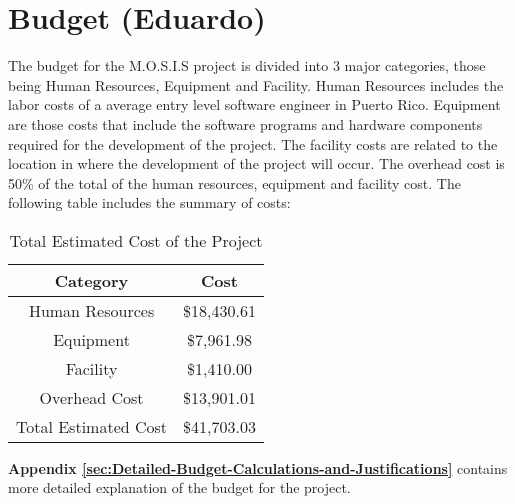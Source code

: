 
 \section{Budget (Eduardo)}
 The budget for the M.O.S.I.S project is divided into 3 major categories, those being Human Resources, Equipment and Facility. Human Resources includes the labor costs of a average entry level software engineer in Puerto Rico\cite{SoftwareEngineerSalary}. Equipment are those costs that include the software programs and hardware components required for the development of the project. The facility costs are related to the location in where the development of the project will occur. The overhead cost is 50\% of the total of the human resources, equipment and facility cost. The following table includes the summary of costs:
 \begin{table}[H]
    \centering
    \begin{tabular}{||c | c||} 
     \hline
     \rowcolor{cyan!50}
     Category & Cost \\ [0.5ex] 
     \hline
     Human Resources & \$18,430.61\\ 
     \hline
     Equipment & \$7,961.98\\
     \hline
     Facility & \$1,410.00\\
     \hline
     Overhead Cost & \$13,901.01\\
     \hline
     \rowcolor{teal!50}
     Total Estimated Cost & \$41,703.03\\
     \hline
    \end{tabular}
    \caption {Total Estimated Cost of the Project}
    \label {table:1}
\end{table}
\textbf{Appendix \ref{sec:Detailed-Budget-Calculations-and-Justifications}} contains more detailed explanation of the budget for the project.